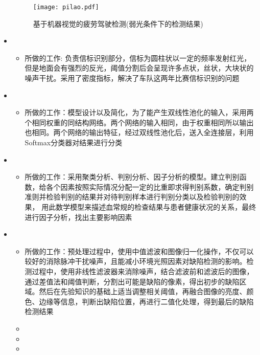 \begin{itemize}[leftmargin=*]
{\begin{itemize}
      \begin{figure}
      	\centering
      	\texttt{[image: pilao.pdf]}
      	\caption{基于机器视觉的疲劳驾驶检测(弱光条件下的检测结果)\label{sa}}
      \end{figure}
    \end{itemize}
    }
    \item {}
    {\small
    \begin{itemize}
      \item 所做的工作: 负责信标识别部分，信标为圆柱状以一定的频率发射红光，但是地面会有强烈的反光，阈值分割后会呈现许多点状，丝状，大块状的噪声干扰。采用了密度指标，解决了车队这两年比赛信标识别的问题
    \end{itemize}
    }
    \item {}
	{\small
	\begin{itemize}
		\item 所做的工作：模型设计以及简化，为了能产生双线性池化的输入，采用两个相同权重的同结构网络。两个网络的输入相同，由于权重相同所以输出也相同。两个网络的输出特征，经过双线性池化后，送入全连接层，利用Softmax分类器对结果进行分类
	\end{itemize}
	}
    \item {}
	{\small
	\begin{itemize}
	\item 所做的工作：采用聚类分析、判别分析、因子分析的模型。建立判别函数，给各个因素按照实际情况分配一定的比重即求得判别系数，确定判别准则并检验判别的结果并对待判别样本进行判别分类以及检验判别的效果， 用此数学模型来描述血常规的检查结果与患者健康状况的关系，最终进行因子分析，找出主要影响因素
	\end{itemize}
	}
	 \item {}
	{\small
		\begin{itemize}
			\item 所做的工作：预处理过程中，使用中值滤波和图像归一化操作，不仅可以较好的消除脉冲干扰噪声，且能减小环境光照因素对缺陷检测的影响。检测过程中，使用非线性滤波器来消除噪声，结合滤波前和滤波后的图像，通过差值法和阈值判断，分割出可能是缺陷的像素，得出初步的缺陷区域。然后在先验知识的基础上适当调整相关阈值，再融合图像的亮度、颜色、边缘等信息，判断出缺陷位置，再进行二值化处理，得到最后的缺陷检测结果
			\item
			\item
			\item
		\end{itemize}

	}
  \end{itemize}